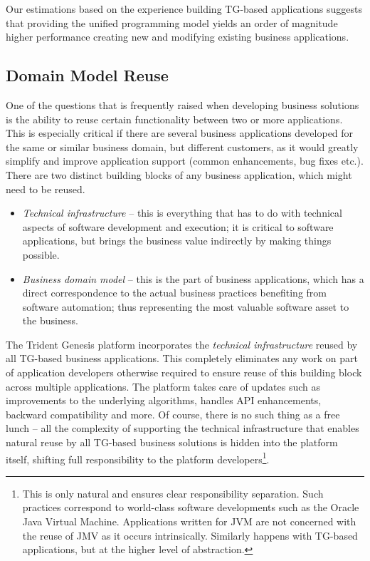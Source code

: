   Our estimations based on the experience building TG-based applications suggests that providing the unified programming model yields an order of magnitude higher performance creating new and modifying existing business applications.

\subsection{Domain Model Reuse}
  One of the questions that is frequently raised when developing business solutions is the ability to reuse certain functionality between two or more applications.
  This is especially critical if there are several business applications developed for the same or similar business domain, but different customers, as it would greatly simplify and improve application support (common enhancements, bug fixes etc.).
  There are two distinct building blocks of any business application, which might need to be reused.
  \begin{itemize}
   \item \emph{Technical infrastructure} -- this is everything that has to do with technical aspects of software development and execution; it is critical to software applications, but brings the business value indirectly by making things possible.
    \item \emph{Business domain model} --  this is the part of business applications, which has a direct correspondence to the actual business practices benefiting from software automation; thus representing the most valuable software asset to the business.
  \end{itemize}

  The Trident Genesis platform incorporates the \emph{technical infrastructure} reused by all TG-based business applications.
  This completely eliminates any work on part of application developers otherwise required to ensure reuse of this building block across multiple applications.
  The platform takes care of updates such as improvements to the underlying algorithms, handles API enhancements, backward compatibility and more.
  Of course, there is no such thing as a free lunch -- all the complexity of supporting the technical infrastructure that enables natural reuse by all TG-based business solutions is hidden into the platform itself, shifting full responsibility to the platform developers\footnote{This is only natural and ensures clear responsibility separation. Such practices correspond to world-class software developments such as the Oracle Java Virtual Machine. 
  Applications written for JVM are not concerned with the reuse of JMV as it occurs intrinsically. Similarly happens with TG-based applications, but at the higher level of abstraction.}.

